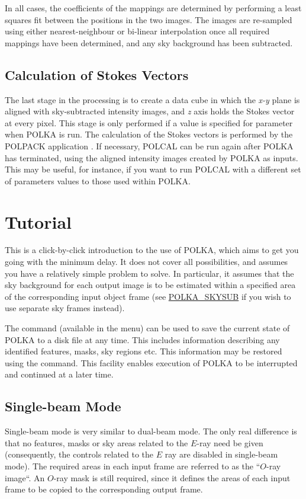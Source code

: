 In all cases, the coefficients of the mappings are determined by
performing a least squares fit between the positions in the two images.
The images are re-sampled using either nearest-neighbour or bi-linear
interpolation once all required mappings have been determined, and any
sky background has been subtracted.

\subsection{Calculation of Stokes Vectors}
The last stage in the processing is to create a data cube in which the
{\em x-y} plane is aligned with sky-subtracted intensity images, and {\em
z} axis holds the Stokes vector at every pixel. This stage is only
performed if a value is specified for parameter 
when POLKA is run. The calculation of the Stokes vectors is performed by
the POLPACK application . If necessary, 
POLCAL can be run again after POLKA has terminated, using the aligned
intensity images created by POLKA as inputs. This may be useful, for
instance, if you want to run POLCAL with a different set of parameters 
values to those used within POLKA.

\section {Tutorial}
This is a click-by-click introduction to the use of POLKA, which aims to
get you going with the minimum delay. It does not cover all possibilities,
and assumes you have a relatively simple problem to solve. In particular, 
it assumes that the sky background for each output image is to be
estimated within a specified area of the corresponding input object frame
(see \hyperref{here}{section }{}{POLKA_SKYSUB} if you wish to use
separate sky frames instead).

The  command (available in the  menu) can be used to save the current state of
POLKA to a disk file at any time. This includes information describing
any identified features, masks, sky regions etc. This information may be
restored using the  command. This
facility enables execution of POLKA to be interrupted and continued at a
later time.

\subsection {Single-beam Mode}
Single-beam mode is very similar to dual-beam mode. The only real
difference is that no features, masks or sky areas related to the $E$-ray
need be given (consequently, the controls related to the $E$ ray are
disabled in single-beam mode). The required areas in each input frame are
referred to as the ``$O$-ray image``. An $O$-ray mask is still required,
since it defines the areas of each input frame to be copied to the
corresponding output frame.

